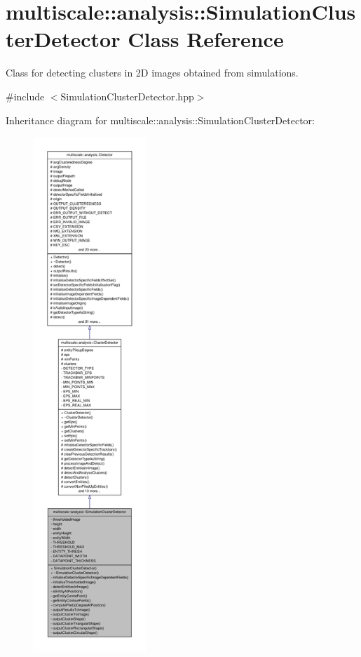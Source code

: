 \hypertarget{classmultiscale_1_1analysis_1_1SimulationClusterDetector}{\section{multiscale\-:\-:analysis\-:\-:\-Simulation\-Cluster\-Detector \-Class \-Reference}
\label{classmultiscale_1_1analysis_1_1SimulationClusterDetector}
}


\-Class for detecting clusters in 2\-D images obtained from simulations.  




{\ttfamily \#include $<$\-Simulation\-Cluster\-Detector.\-hpp$>$}



\-Inheritance diagram for multiscale\-:\-:analysis\-:\-:\-Simulation\-Cluster\-Detector\-:
\nopagebreak
\begin{figure}[H]
\begin{center}
\leavevmode
\includegraphics[height=550pt]{classmultiscale_1_1analysis_1_1SimulationClusterDetector__inherit__graph}
\end{center}
\end{figure}


